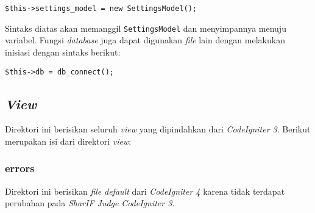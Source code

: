 \begin{center}
\verb|$this->settings_model = new SettingsModel();|
\end{center}

Sintaks diatas akan memanggil \texttt{SettingsModel} dan menyimpannya menuju variabel. Fungsi \textit{database} juga dapat digunakan \textit{file} lain dengan melakukan inisiasi dengan sintaks berikut:
\begin{center}
	\verb|$this->db = db_connect();|
\end{center}

\subsection{\textit{View}}
Direktori ini berisikan seluruh \textit{view} yang dipindahkan dari \textit{CodeIgniter 3}. Berikut merupakan isi dari direktori \textit{view}:
\subsubsection{errors}
Direktori ini berisikan \textit{file} \textit{default} dari \textit{CodeIgniter 4} karena tidak terdapat perubahan pada \textit{SharIF Judge} \textit{CodeIgniter 3}.
